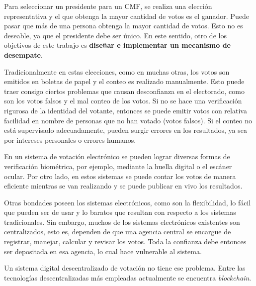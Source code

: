 Para seleccionar un presidente para un CMF, se realiza una elecci\'on representativa y el que obtenga la mayor cantidad de votos es el ganador. Puede pasar que m\'as de una persona obtenga la mayor cantidad de votos.   Esto no es deseable, ya que el presidente debe ser \'unico. En este sentido, otro de los objetivos de este trabajo es \textbf{dise\~nar e implementar un mecanismo de desempate}.


Tradicionalmente en estas elecciones, como en muchas otras, los votos son emitidos en boletas de papel y el conteo es realizado manualmente. Esto puede traer consigo ciertos problemas que causan desconfianza en el electorado, como son los votos falsos y el mal conteo de los votos.   Si no se hace una verificaci\'on rigurosa de la identidad del votante, entonces se puede emitir votos con relativa facilidad en nombre de personas que no han votado (votos falsos). Si el conteo no est\'a supervisado adecuadamente, pueden surgir errores en los resultados, ya sea por intereses personales o errores humanos.

En un sistema de votaci\'on electr\'onico se  pueden lograr diversas formas de verificaci\'on biom\'etrica, por ejemplo, mediante la huella digital o el esc\'aner ocular. Por otro lado, en estos sistemas se puede contar los votos de manera eficiente mientras se van realizando y se  puede publicar en vivo los resultados. 

Otras bondades poseen los sistemas electrónicos, como son la flexibilidad, lo fácil que pueden ser de usar y lo baratos que resultan con respecto a los sistemas tradicionales. Sin embargo, muchos de los sistemas electrónicos existentes son centralizados, esto es, dependen de que una agencia central se encargue de registrar, manejar, calcular y revisar los votos. Toda la confianza debe entonces ser depositada en esa agencia, lo cual hace vulnerable al sistema.
 
Un sistema digital descentralizado de votación no tiene ese problema. Entre las tecnologías descentralizadas más empleadas actualmente se encuentra \textit{blockchain}.  



